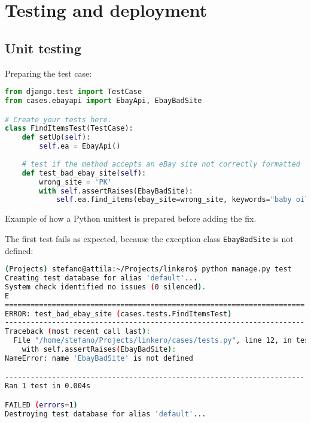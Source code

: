 \chapter{Testing and deployment}

\section{Unit testing}

Preparing the test case:
\begin{lstlisting}[language=Python, breaklines=true]
from django.test import TestCase
from cases.ebayapi import EbayApi, EbayBadSite

# Create your tests here.
class FindItemsTest(TestCase):
    def setUp(self):
        self.ea = EbayApi()
    
    # test if the method accepts an eBay site not correctly formatted
    def test_bad_ebay_site(self):
        wrong_site = 'PK'
        with self.assertRaises(EbayBadSite):
            self.ea.find_items(ebay_site=wrong_site, keywords="baby oil")
\end{lstlisting}

Example of how a Python unittest is prepared before adding the fix.

The first test fails as expected, because the exception class
\texttt{EbayBadSite} is not defined:
\begin{lstlisting}[language=bash, breaklines=true]
(Projects) stefano@attila:~/Projects/linkero$ python manage.py test
Creating test database for alias 'default'...
System check identified no issues (0 silenced).
E
======================================================================
ERROR: test_bad_ebay_site (cases.tests.FindItemsTest)
----------------------------------------------------------------------
Traceback (most recent call last):
  File "/home/stefano/Projects/linkero/cases/tests.py", line 12, in test_bad_ebay_site
    with self.assertRaises(EbayBadSite):
NameError: name 'EbayBadSite' is not defined

----------------------------------------------------------------------
Ran 1 test in 0.004s

FAILED (errors=1)
Destroying test database for alias 'default'...
\end{lstlisting}


